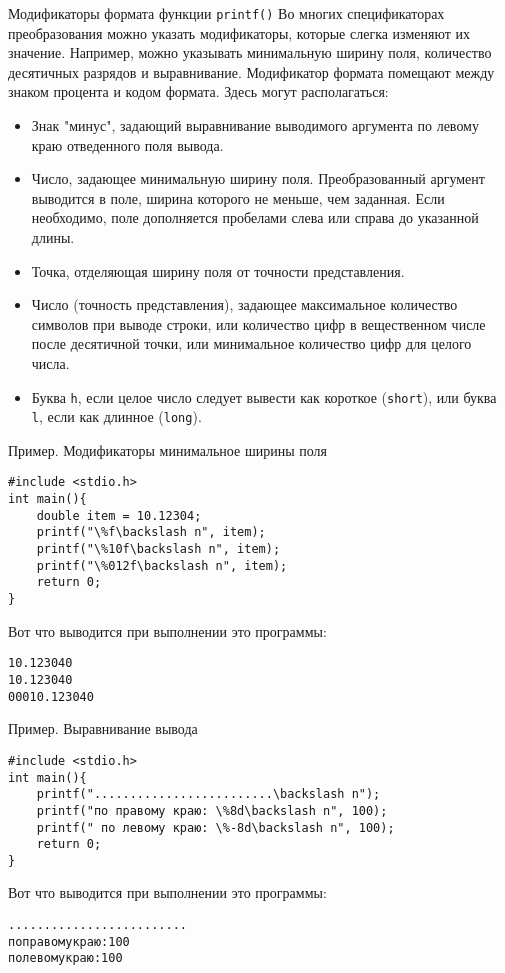 \documentclass[xcolor=table]{beamer}
\begin{document}
\begin{frame}{Модификаторы формата функции \texttt{printf()}}
    Во многих спецификаторах преобразования можно указать модификаторы, которые слегка изменяют их значение. Например, можно указывать минимальную ширину поля, количество десятичных разрядов и выравнивание. Модификатор формата помещают между знаком процента и кодом формата. Здесь могут располагаться:
    \begin{itemize}
        \item Знак "минус", задающий выравнивание выводимого аргумента по левому краю отведенного поля вывода.
        \item Число, задающее минимальную ширину поля. Преобразованный аргумент выводится в поле, ширина которого не меньше, чем заданная. Если необходимо, поле дополняется пробелами слева или справа до указанной длины.
        \item Точка, отделяющая ширину поля от точности представления.
        \item Число (точность представления), задающее максимальное количество символов при выводе строки, или количество цифр в вещественном числе после десятичной точки, или минимальное количество цифр для целого числа.
        \item Буква \texttt{h}, если целое число следует вывести как короткое (\texttt{short}), или буква \texttt{l}, если как длинное (\texttt{long}).
    \end{itemize}
\end{frame}

\begin{frame}[fragile]{Пример. Модификаторы минимальное ширины поля}
\begin{verbatim}
#include <stdio.h>
int main(){
    double item = 10.12304;
    printf("\%f\backslash n", item);
    printf("\%10f\backslash n", item);
    printf("\%012f\backslash n", item);
    return 0;
}
\end{verbatim}
    
    Вот что выводится при выполнении это программы:
\begin{alltt}
10.123040
 10.123040
00010.123040 
\end{alltt}
\end{frame}


\begin{frame}[fragile]{Пример. Выравнивание вывода}
\begin{verbatim}
#include <stdio.h>
int main(){
    printf(".........................\backslash n");
    printf("по правому краю: \%8d\backslash n", 100);
    printf(" по левому краю: \%-8d\backslash n", 100);
    return 0;
}
\end{verbatim}
    
    Вот что выводится при выполнении это программы:
\begin{alltt}
.........................
по правому краю:      100
 по левому краю: 100
\end{alltt}
\end{frame}
\end{document}
